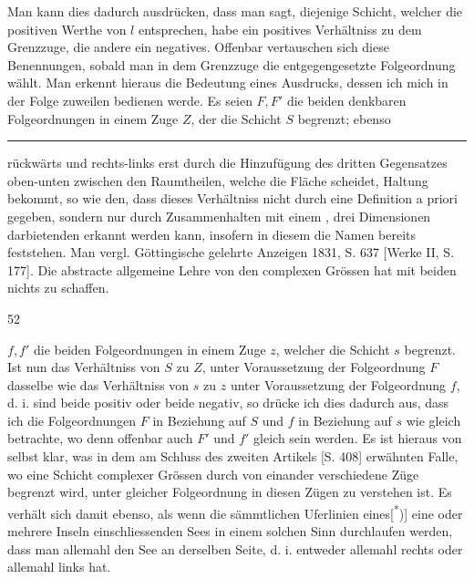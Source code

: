 Man kann dies dadurch ausdrücken, dass man sagt, diejenige Schicht, welcher die positiven Werthe von \(l\) entsprechen, habe ein positives Verhältniss zu dem Grenzzuge, die andere ein negatives. Offenbar vertauschen sich diese Benennungen, sobald man in dem Grenzzuge die entgegengesetzte Folgeordnung wählt. Man erkennt hieraus die Bedeutung eines Ausdrucks, dessen ich mich in der Folge zuweilen bedienen werde. Es seien \(F,F'\) die beiden denkbaren Folgeordnungen in einem Zuge \(Z\), der die Schicht \(S\) begrenzt; ebenso
\par\vfill\noindent\rule{.25\linewidth}{.4pt}\par\smallskip
{\footnotesize\noindent rückwärts und rechts-links erst durch die Hinzufügung des dritten Gegensatzes oben-unten zwischen den Raumtheilen, welche die Fläche scheidet, Haltung bekommt, so wie den, dass dieses Verhältniss nicht durch eine Definition a priori gegeben, sondern nur durch Zusammenhalten mit einem , drei Dimensionen darbietenden erkannt werden kann, insofern in diesem die Namen bereits feststehen. Man vergl. Göttingische gelehrte Anzeigen 1831, S. 637 [Werke II, S. 177]. Die abstracte allgemeine Lehre von den complexen Grössen hat mit beiden nichts zu schaffen.\par}
\smallskip{}\hfill{\small 52}\par
\clearpage{}
\noindent \(f,f'\) die beiden Folgeordnungen in einem Zuge \(z\), welcher die Schicht \(s\) begrenzt. Ist nun das Verhältniss von \(S\) zu \(Z\), unter Voraussetzung der Folgeordnung \(F\) dasselbe wie das Verhältniss von \(s\) zu \(z\) unter Voraussetzung der Folgeordnung \(f\), d. i. sind beide positiv oder beide negativ, so drücke ich dies dadurch aus, dass ich die Folgeordnungen \(F\) in Beziehung auf \(S\) und \(f\) in Beziehung auf \(s\) wie gleich betrachte, wo denn offenbar auch \(F'\) und \(f'\) gleich sein werden. Es ist hieraus von selbst klar, was in dem am Schluss des zweiten Artikels [S. {\small 408}] erwähnten Falle, wo eine Schicht complexer Grössen durch  von einander verschiedene Züge begrenzt wird, unter gleicher Folgeordnung in diesen Zügen zu verstehen ist. Es verhält sich damit ebenso, als wenn die sämmtlichen Uferlinien eines[\textsuperscript{*})] eine oder mehrere Inseln einschliessenden Sees in einem solchen Sinn durchlaufen werden, dass man allemahl den See an derselben Seite, d. i. entweder allemahl rechts oder allemahl links hat.
\begingroup\makeatletter\long\def\@makefntext#1{\noindent\hspace*{1.2em}#1}\makeatother
{}\endgroup
